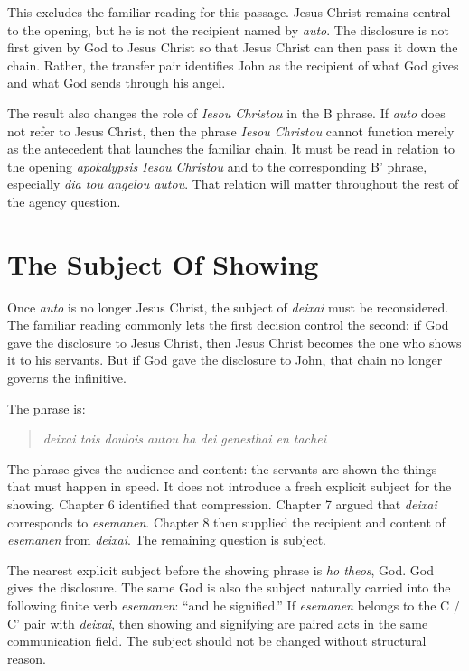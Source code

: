 This excludes the familiar reading for this passage. Jesus Christ remains central to the opening, but he is not the recipient named by \textit{auto}. The disclosure is not first given by God to Jesus Christ so that Jesus Christ can then pass it down the chain. Rather, the transfer pair identifies John as the recipient of what God gives and what God sends through his angel.

The result also changes the role of \textit{Iesou Christou} in the B phrase. If \textit{auto} does not refer to Jesus Christ, then the phrase \textit{Iesou Christou} cannot function merely as the antecedent that launches the familiar chain. It must be read in relation to the opening \textit{apokalypsis Iesou Christou} and to the corresponding B' phrase, especially \textit{dia tou angelou autou}. That relation will matter throughout the rest of the agency question.

\section{The Subject Of Showing}

Once \textit{auto} is no longer Jesus Christ, the subject of \textit{deixai} must be reconsidered. The familiar reading commonly lets the first decision control the second: if God gave the disclosure to Jesus Christ, then Jesus Christ becomes the one who shows it to his servants. But if God gave the disclosure to John, that chain no longer governs the infinitive.

The phrase is:

\begin{quote}
\textit{deixai tois doulois autou ha dei genesthai en tachei}
\end{quote}

The phrase gives the audience and content: the servants are shown the things that must happen in speed. It does not introduce a fresh explicit subject for the showing. Chapter 6 identified that compression. Chapter 7 argued that \textit{deixai} corresponds to \textit{esemanen}. Chapter 8 then supplied the recipient and content of \textit{esemanen} from \textit{deixai}. The remaining question is subject.

The nearest explicit subject before the showing phrase is \textit{ho theos}, God. God gives the disclosure. The same God is also the subject naturally carried into the following finite verb \textit{esemanen}: ``and he signified.'' If \textit{esemanen} belongs to the C / C' pair with \textit{deixai}, then showing and signifying are paired acts in the same communication field. The subject should not be changed without structural reason.

